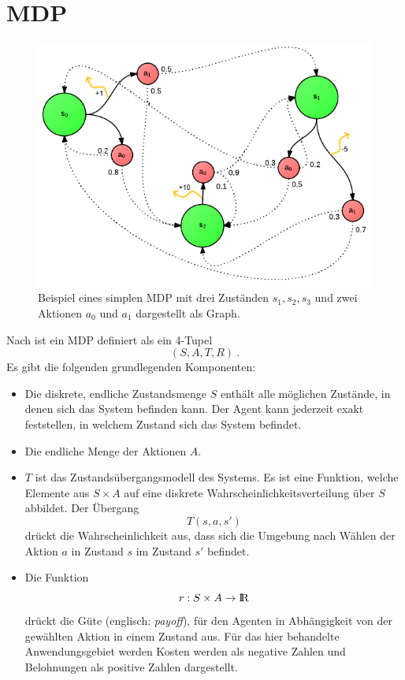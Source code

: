 \documentclass[a4paper]{IEEEtran}
\def\IR{\mathrm{I\hspace{-2pt}R}} %
\begin{document}
\section{MDP}
\begin{figure}[ht]
	\centering
	\includegraphics[scale=0.60]{images/MDP_example.png}
	\caption{Beispiel eines simplen MDP mit drei Zuständen $s_1, s_2, s_3$ und zwei Aktionen $a_0$ und $a_1$ dargestellt als Graph.}
	\label{fig:MDP_example} %
\end{figure}
Nach \cite{cassandra1995acting} ist ein MDP definiert als ein 4-Tupel
\begin{equation}
	(S, A, T, R) \ .
\end{equation}
Es gibt die folgenden grundlegenden Komponenten:
\begin{itemize}
	\item Die diskrete, endliche Zustandsmenge $S$ enthält alle möglichen Zustände, in denen sich das System befinden kann. Der Agent kann jederzeit exakt feststellen, in welchem Zustand sich das System befindet.
	\item Die endliche Menge der Aktionen $A$.
	\item $T$ ist das Zustandsübergangsmodell des Systems. Es ist eine Funktion, welche Elemente aus $S \times A$ auf eine diskrete Wahrscheinlichkeitsverteilung über $S$ abbildet. Der Übergang
	\begin{equation}
		T(s, a, s')
	\end{equation}
	drückt die Wahrscheinlichkeit aus, dass sich die Umgebung nach Wählen der Aktion $a$ in Zustand $s$ im Zustand $s'$ befindet.
	\item Die Funktion
	\begin{equation}
		r: S \times A \rightarrow \IR
		\label{eq:payoff}
	\end{equation}
	drückt die Güte (englisch: \emph{payoff}), für den Agenten in Abhängigkeit von der gewählten Aktion in einem Zustand aus. Für das hier behandelte Anwendungsgebiet werden Kosten werden als negative Zahlen und Belohnungen als positive Zahlen dargestellt.
\end{itemize}
\end{document}
